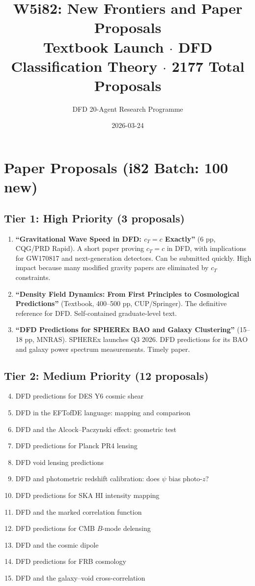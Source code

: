 \documentclass[11pt,a4paper]{article}
\title{W5i82: New Frontiers and Paper Proposals\\[6pt]
\large Textbook Launch $\cdot$ DFD Classification Theory $\cdot$ 2177 Total Proposals}
\author{DFD 20-Agent Research Programme}
\date{2026-03-24}
\begin{document}
\maketitle

\section{Paper Proposals (i82 Batch: 100 new)}

\subsection{Tier 1: High Priority (3 proposals)}

\begin{enumerate}[nosep]
\item \textbf{``Gravitational Wave Speed in DFD: $c_T = c$ Exactly''} (6 pp, CQG/PRD Rapid). A short paper proving $c_T = c$ in DFD, with implications for GW170817 and next-generation detectors. Can be submitted quickly. High impact because many modified gravity papers are eliminated by $c_T$ constraints.

\item \textbf{``Density Field Dynamics: From First Principles to Cosmological Predictions''} (Textbook, 400--500 pp, CUP/Springer). The definitive reference for DFD. Self-contained graduate-level text.

\item \textbf{``DFD Predictions for SPHEREx BAO and Galaxy Clustering''} (15--18 pp, MNRAS). SPHEREx launches Q3 2026. DFD predictions for its BAO and galaxy power spectrum measurements. Timely paper.
\end{enumerate}

\subsection{Tier 2: Medium Priority (12 proposals)}

\begin{enumerate}[nosep]
\setcounter{enumi}{3}
\item DFD predictions for DES Y6 cosmic shear
\item DFD in the EFTofDE language: mapping and comparison
\item DFD and the Alcock--Paczynski effect: geometric test
\item DFD predictions for Planck PR4 lensing
\item DFD void lensing predictions
\item DFD and photometric redshift calibration: does $\psi$ bias photo-$z$?
\item DFD predictions for SKA HI intensity mapping
\item DFD and the marked correlation function
\item DFD predictions for CMB $B$-mode delensing
\item DFD and the cosmic dipole
\item DFD predictions for FRB cosmology
\item DFD and the galaxy--void cross-correlation
\end{enumerate}
\end{document}
